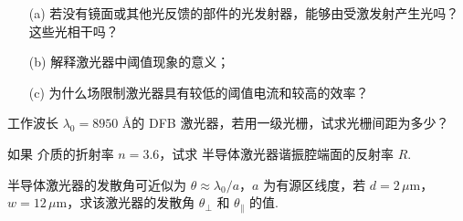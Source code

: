\documentclass{assignment}
\begin{document}
\begin{prob}
    \begin{itemize}
        \item[(a)] 若没有镜面或其他光反馈的部件的光发射器，能够由受激发射产生光吗？这些光相干吗？
        \item[(b)] 解释激光器中阈值现象的意义；
        \item[(c)] 为什么场限制激光器具有较低的阈值电流和较高的效率？
    \end{itemize}
\end{prob}
\begin{ans}
    
\end{ans}

\begin{prob}
    工作波长 $\lambda_0=8950$ \AA 的  DFB 激光器，若用一级光栅，试求光栅间距为多少？
\end{prob}
\begin{sol}
    
\end{sol}

\begin{prob}
    如果  介质的折射率 $n=3.6$，试求  半导体激光器谐振腔端面的反射率 $R$.
\end{prob}
\begin{sol}
    
\end{sol}

\begin{prob}
    半导体激光器的发散角可近似为 $\theta\approx\lambda_0/a$，$a$ 为有源区线度，若 $d=2\,\mu$m，$w=12\,\mu$m，求该激光器的发散角 $\theta_{\perp}$ 和 $\theta_{\parallel}$ 的值.
\end{prob}
\begin{sol}
    
\end{sol}
\end{document}

